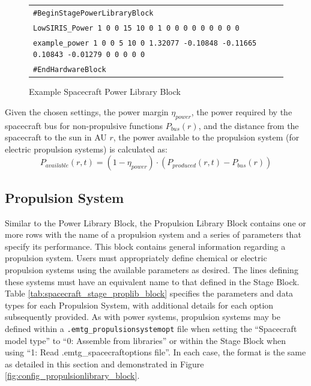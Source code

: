 

\begin{figure}[ht]
    \centering
    \begin{tabular}{|l|}
        \hline
        {\tt \#BeginStagePowerLibraryBlock} \\
        {\tt LowSIRIS\_Power 1 0 0 15 10 0 1 0 0 0 0 0 0 0 0 0} \\
        {\tt example\_power 1 0 0 5 10 0 1.32077 -0.10848 -0.11665 0.10843 -0.01279 0 0 0 0 0} \\
        {\tt \#EndHardwareBlock} \\
        \hline
    \end{tabular}
    \caption{Example Spacecraft Power Library Block}
    \label{fig:config_powerlibrary_block}
\end{figure}



Given the chosen settings, the power margin $\eta_{power}$, the power required by the spacecraft bus for non-propulsive functions $P_{bus}\left(r\right)$, and the distance from the spacecraft to the sun in AU $r$, the power available to the propulsion system (for electric propulsion systems) is calculated as: \\
\begin{equation}
    P_{available}\left(r,t\right) = \left(1 - \eta_{power}\right) \cdot \left(P_{produced}\left(r,t\right) - P_{bus}\left(r\right)\right)
\end{equation}


\subsection{Propulsion System}
\label{sec:propulsion_system}
Similar to the Power Library Block, the Propulsion Library Block contains one or more rows with the name of a propulsion system and a series of parameters that specify its performance. This block contains general information regarding a propulsion system. Users must appropriately define chemical or electric propulsion systems using the available parameters as desired. The lines defining these systems must have an equivalent name to that defined in the Stage Block. Table \ref{tab:spacecraft_stage_proplib_block} specifies the parameters and data types for each Propulsion System, with additional details for each option subsequently provided. As with power systems, propulsion systems may be defined within a {\tt .emtg\_propulsionsystemopt} file when setting the ``Spacecraft model type'' to ``0: Assemble from libraries'' or within the Stage Block when using ``1: Read .emtg\_spacecraftoptions file''. In each case, the format is the same as detailed in this section and demonstrated in Figure \ref{fig:config_propulsionlibrary_block}.

